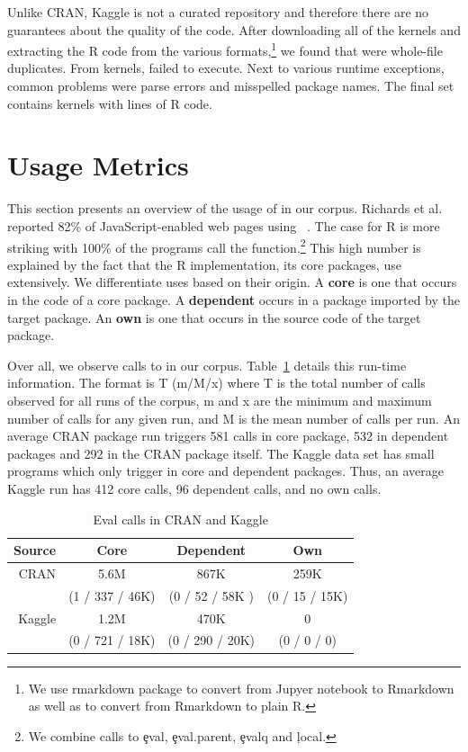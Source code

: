 \documentclass[conference]{IEEEtran}
\begin{document}
Unlike CRAN, Kaggle is not a curated repository and therefore there are no
guarantees about the quality of the code. After downloading all of the
\CorpusKaggle kernels and extracting the R code from the various
formats,\footnote{We use rmarkdown package to convert from Jupyer notebook
  to Rmarkdown as well as to convert from Rmarkdown to plain R.} we found
that \CorpusDuplicatedKaggle were whole-file duplicates. From
\CorpusRunnableKaggle kernels, \CorpusFailedKaggle failed to execute. Next
to various runtime exceptions, common problems were parse errors and
misspelled package names.  The final set contains \CorpusFinishedKaggle
kernels with  lines of R code.

\section{Usage Metrics}

This section presents an overview of the usage of \eval in our corpus.
Richards et al. reported 82\% of JavaScript-enabled web pages using
\eval~\cite{ecoop11}. The case for R is more striking with 100\% of the
programs call the \eval function.\footnote{We combine calls to \c{eval},
  \c{eval.parent}, \c{evalq} and \c{local}.}  This high number is explained
by the fact that the R implementation, its core packages, use \eval
extensively. We differentiate uses based on their origin. A {\bf core} \eval
is one that occurs in the code of a core package.  A {\bf dependent} \eval
occurs in a package imported by the target package. An {\bf own} \eval is
one that occurs in the source code of the target package.

Over all, we observe \AllAllCallCountRnd calls to \eval in our corpus.
Table~\ref{A} details this run-time information. The format is T (m/M/x)
where T is the total number of calls observed for all runs of the corpus, m
and x are the minimum and maximum number of calls for any given run, and M
is the mean number of calls per run. An average CRAN package run triggers
581 {\eval} calls in core package, 532 in dependent packages and 292 in the
CRAN package itself.  The Kaggle data set has small programs which only
trigger \eval in core and dependent packages. Thus, an average Kaggle run
has 412 core calls, 96 dependent calls, and no own calls.

\begin{table}[tb] \centering
 \begin{tabular}{r|c|c|c} \hline
Source & Core    & Dependent                      & Own \\\hline
CRAN   & 5.6M &  867K    & 259K \\
       & (1 / 337 / 46K)& (0 / 52 / 58K ) & (0 / 15 / 15K) \\\hline
Kaggle &  1.2M &  470K   & 0\\
 &  (0 / 721 / 18K) & (0 / 290 / 20K) & (0 / 0 / 0)\\\hline
\end{tabular}\caption{Eval calls in CRAN and Kaggle}\label{A}\end{table}
\end{document}

